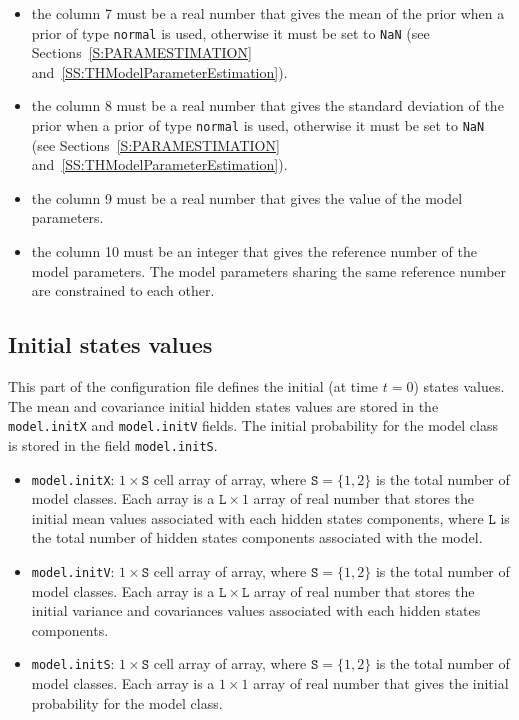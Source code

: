 \begin{itemize}
\item the column 7 must be a real number that gives the mean of the prior when a prior of type \lstinline[basicstyle = \mlttfamily \small ]!normal! is used, otherwise it must be set to \lstinline[basicstyle = \mlttfamily \small ]!NaN! (see Sections~\ref{S:PARAMESTIMATION} and~\ref{SS:THModelParameterEstimation}).
\item the column 8 must be a real number that gives the standard deviation of the prior when a prior of type \lstinline[basicstyle = \mlttfamily \small ]!normal! is used, otherwise it must be set to \lstinline[basicstyle = \mlttfamily \small ]!NaN! (see Sections~\ref{S:PARAMESTIMATION} and~\ref{SS:THModelParameterEstimation}).
\item the column 9 must be a real number that gives the value of the model parameters.
\item the column 10 must be an integer that gives the reference number of the model parameters. The model parameters sharing the same reference number are constrained to each other.
\end{itemize}

\subsection{Initial states values}
\label{SS:InitialHS}
This part of the configuration file defines the initial (at time $t=0$) states values.
The mean and covariance initial hidden states values are stored in the \lstinline[basicstyle = \mlttfamily \small ]!model.initX! and \lstinline[basicstyle = \mlttfamily \small ]!model.initV! fields.
The initial probability for the model class is stored in the field \lstinline[basicstyle = \mlttfamily \small ]!model.initS!.

\begin{itemize}
\item \lstinline[basicstyle = \mlttfamily \small ]!model.initX!: $1\times \mathtt{S}$ cell array of array, where $\mathtt{S} = \{1, 2 \}$ is the total number of model classes.
Each array is a $\mathtt{L}\times1$ array of real number that stores the initial mean values associated with each hidden states components, where $\mathtt{L}$ is the total number of hidden states components associated with the model.
\item \lstinline[basicstyle = \mlttfamily \small ]!model.initV!: $1\times \mathtt{S}$ cell array of array, where $\mathtt{S} = \{1, 2 \}$ is the total number of model classes.
Each array is a $\mathtt{L}\times\mathtt{L}$ array of real number that stores the initial variance and covariances values associated with each hidden states components.
\item \lstinline[basicstyle = \mlttfamily \small ]!model.initS!: $1\times \mathtt{S}$ cell array of array, where $\mathtt{S} = \{1, 2 \}$ is the total number of model classes. 
Each array is a  $1\times1$ array of real number that gives the initial probability for the model class.
\end{itemize}

